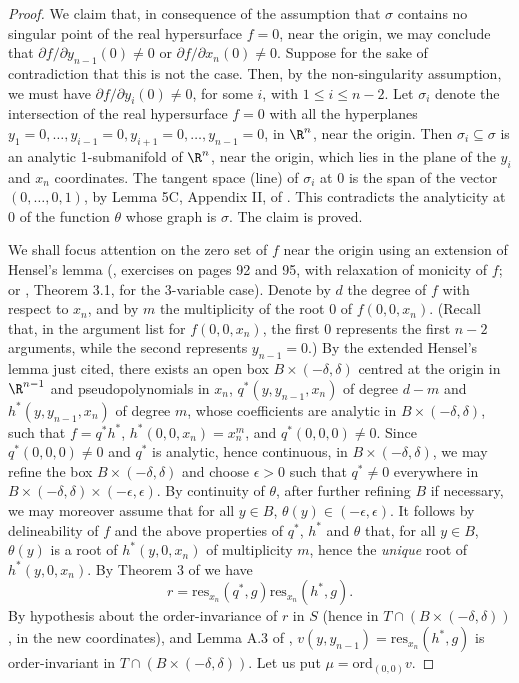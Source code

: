 \documentclass{article}
\begin{document}
\begin{proof}
    We claim that, in consequence of the assumption that $\sigma$
    contains no singular point of the real hypersurface $f=0$, near
    the origin, we may conclude that 
    $\partial f/\partial y_{n-1} (0) \neq 0$
    or $\partial f/\partial x_n (0)\neq 0$. 
    Suppose for the sake of contradiction that this is not the case.
    Then, by the non-singularity assumption, we must have
    $\partial f/\partial y_i (0) \neq 0$, for some $i$,
    with $1 \le i \le n-2$. Let $\sigma_i$ denote the intersection
    of the real hypersurface $f = 0$ with all the hyperplanes
    $y_1 = 0, \ldots, y_{i-1} = 0, y_{i+1} = 0, \ldots, y_{n-1} = 0$,
    in $\R^n$, near the origin. Then $\sigma_i \subseteq \sigma$ is an
    analytic 1-submanifold of $\R^n$, near the origin, which lies
    in the plane of the $y_i$ and $x_n$ coordinates.
    The tangent space (line) of $\sigma_i$ at $0$ is 
    the span of the vector
    $(0, \ldots, 0, 1)$, by Lemma 5C, Appendix II, of
    \cite{Whitney1972}. This contradicts the analyticity at $0$ of the
    function $\theta$ whose graph is $\sigma$. The claim is proved.

    We shall focus attention on the zero set of $f$ near the origin
    using an extension of Hensel's lemma (\cite{Abhyankar1990}, exercises
    on pages 92 and 95, with relaxation of monicity of $f$; or 
    \cite{McCallum1999}, Theorem 3.1, for
    the 3-variable case). Denote by $d$ the degree of $f$ with respect to
    $x_n$, and by $m$ the multiplicity of the root $0$ of $f(0,0,x_n)$.
    (Recall that, in the argument list for $f(0,0,x_n)$, the first $0$
    represents the first $n-2$ arguments, while the second represents
    $y_{n-1} = 0$.) By the extended Hensel's lemma just cited,
    there exists an open box $B \times (-\delta, \delta)$ 
    centred at the origin in $\R^{n-1}$
    and pseudopolynomials in $x_n$, $q^*(y, y_{n-1}, x_n)$ 
    of degree $d-m$ 
    and $h^*(y, y_{n-1}, x_n)$ of degree $m$, whose coefficients are 
    analytic in $B \times (-\delta, \delta)$, 
    such that $f = q^*h^*$, $h^*(0,0,x_n) = x_n^m$,
    and $q^*(0,0,0) \neq 0$. Since $q^*(0,0,0) \neq 0$ and $q^*$ is
    analytic, hence continuous, in $B \times (-\delta, \delta)$, 
    we may refine the box $B \times (-\delta, \delta)$
    and choose $\epsilon > 0$ such that $q^* \neq 0$ everywhere in
    $B \times (-\delta, \delta) \times (-\epsilon, \epsilon)$. 
    By continuity of $\theta$,
    after further refining $B$ if necessary, we may moreover assume that 
    for all $y \in B$, $\theta(y) \in (-\epsilon, \epsilon)$.
    It follows by delineability of $f$ and the above properties of $q^*$, 
    $h^*$ and $\theta$ that, for all $y \in B$,
    $\theta(y)$ is a root of $h^*(y, 0, x_n)$ of multiplicity $m$, 
    hence the {\em unique} root of $h^*(y, 0, x_n)$.
    By Theorem 3 of \cite{Loos1982} we have
    \[r = \mathrm{res}_{x_n}(q^*,g) \mathrm{res}_{x_n}(h^*,g).\]
    By hypothesis about the order-invariance of $r$ in $S$ 
    (hence in $T \cap (B \times (-\delta, \delta))$, in the new 
    coordinates), and Lemma A.3 of
    \cite{McCallum1988}, $v(y, y_{n-1}) = \mathrm{res}_{x_n}(h^*,g)$ 
    is order-invariant in $T \cap (B \times (-\delta, \delta))$. 
    Let us put 
    $\mu = \mathrm {ord}_{(0,0)} v$.


\end{proof}
\end{document}
